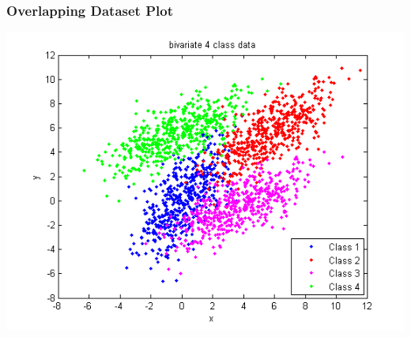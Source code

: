 \documentclass{beamer}
\begin{document}
\begin{frame}
\frametitle{Overlapping Dataset Plot}
\begin{center}
\includegraphics[scale=0.6]{data_overlapping}
\end{center}
\end{frame}
\end{document}
